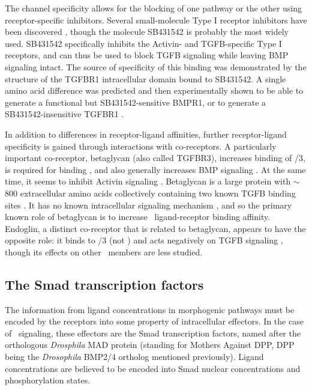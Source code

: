The channel specificity allows for the blocking of one
pathway or the other using receptor-specific inhibitors.
Several small-molecule Type I receptor inhibitors have been discovered \cite{Tojo2005,Vogt2011},
though the molecule SB431542 \cite{Inman2002} is probably the most widely used.
SB431542 specifically inhibits the Activin- and TGFB-specific Type I receptors,
and can thus be used to block TGFB signaling
while leaving BMP signaling intact. The source of specificity of this binding was demonstrated
by the structure of the TGFBR1 intracellular domain bound to SB431542. A single
amino acid difference was predicted and then experimentally shown to be able to generate a functional
but SB431542-sensitive BMPR1, or to generate a SB431542-insensitive TGFBR1 \cite{Ogunjimi2012}.


In addition to differences in receptor-ligand affinities,
further receptor-ligand specificity is gained through interactions with co-receptors.
A particularly important co-receptor, betaglycan (also called TGFBR3), increases
binding of /3, is required for  binding \cite{Derynck2003,Dijke2004}, and
also generally increases BMP signaling \cite{Kirkbride2008}. At the same time, it seems to
inhibit Activin signaling \cite{Bilandzic2011}. Betaglycan is a large protein with
$\sim$800 extracellular amino acids collectively containing two known TGFB binding
sites \cite{Kaname1996,Mendoza2009}.
It has no known intracellular signaling mechanism \cite{Bilandzic2011}, and so the
primary known role of betaglycan is to increase \tgfbsf\ ligand-receptor binding affinity.
Endoglin, a distinct co-receptor that is related to betaglycan, appears to have the opposite
role: it binds to /3 (not )
and acts negatively on TGFB signaling \cite{Lastres1996,Letamendia1998,Bernabeu2009}, though
its effects on other \tgfbsf\ members are less studied.



\subsection{The Smad transcription factors}
\label{pathways:tgfb:smads}


The information from ligand concentrations in morphogenic pathways
must be encoded by the receptors into some property of intracellular effectors.
In the case of \tgfbsf\ signaling, these effectors are the Smad
transcription factors, named after the orthologous \textit{Drosphila}
MAD protein (standing for Mothers Against DPP, DPP being
the \textit{Drosophila} BMP2/4 ortholog mentioned previously).
Ligand concentrations are believed to be encoded into Smad
nuclear concentrations and phosphorylation states.


